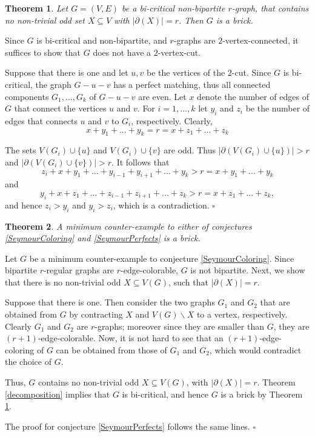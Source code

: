\documentclass[fleqn,12pt]{article}
\newtheorem{theorem}{Theorem}
\newenvironment{proof}[1][Proof.]{\begin{trivlist}
\item[\hskip \labelsep {\bfseries #1}]}{\end{trivlist}}
\begin{document}
\begin{theorem}\label{BrickTheorem} Let $G=(V,E)$ be a bi-critical non-bipartite $r$-graph, that contains no non-trivial odd set $X \subseteq V$ with $|\partial(X)|=r$. Then $G$ is a brick.
\end{theorem}

\begin{proof} Since $G$ is bi-critical and non-bipartite, and $r$-graphs are $2$-vertex-connected, it suffices to show that $G$ does not have a $2$-vertex-cut. 

Suppose that there is one and let $u,v$ be the vertices of the $2$-cut. Since $G$ is bi-critical, the graph $G-u-v$ has a perfect matching, thus all connected 
components $G_1,...,G_k$ of $G-u-v$ are even. Let $x$ denote the number of edges of $G$ that connect the vertices $u$ and $v$. For $i=1,...,k$ let $y_i$ and $z_i$ 
be the number of edges that connects $u$ and $v$ to $G_i$, respectively. Clearly,
\begin{equation*}
x+y_1+...+y_k=r=x+z_1+...+z_k
\end{equation*}

The sets $V(G_i)\cup \{u\}$ and $V(G_i)\cup \{v\}$ are odd. Thus $|\partial(V(G_i)\cup \{u\})|> r$ and $|\partial(V(G_i)\cup \{v\})|> r$. It follows that
\begin{equation*}
z_i+x+y_1+...+y_{i-1}+y_{i+1}+...+y_k>r=x+y_1+...+y_k
\end{equation*}
and
\begin{equation*}
y_i+x+z_1+...+z_{i-1}+z_{i+1}+...+z_k>r=x+z_1+...+z_k,
\end{equation*}
and hence
$z_i>y_i$ and $y_i>z_i$, which is a contradiction.
$\square$
\end{proof}

\begin{theorem} A minimum counter-example to either of conjectures \ref{SeymourColoring} and \ref{SeymourPerfects} is a brick.
\end{theorem}

\begin{proof} Let $G$ be a minimum counter-example to conjecture \ref{SeymourColoring}. Since bipartite $r$-regular graphs are $r$-edge-colorable, $G$ is not bipartite. Next, we show that there is no non-trivial odd $X\subseteq V(G)$, such that $|\partial(X)|=r$. 

Suppose that there is one. Then consider the two graphs $G_1$ and $G_2$ that are obtained from $G$ by contracting $X$ and $V(G)\backslash X$ to a vertex, respectively. Clearly $G_1$ and $G_2$ are $r$-graphs; moreover since they are smaller than $G$, they are $(r+1)$-edge-colorable. Now, it is not hard to see that an $(r+1)$-edge-coloring of $G$ can be obtained from those of $G_1$ and $G_2$, which would contradict the choice of $G$.

Thus, $G$ contains no non-trivial odd $X\subseteq V(G)$, with $|\partial(X)|=r$. Theorem \ref{decomposition} implies that $G$ is bi-critical, and hence $G$ is a brick by 
Theorem \ref{BrickTheorem}.

The proof for conjecture \ref{SeymourPerfects} follows the same lines.
$\square$
\end{proof}
\end{document}
